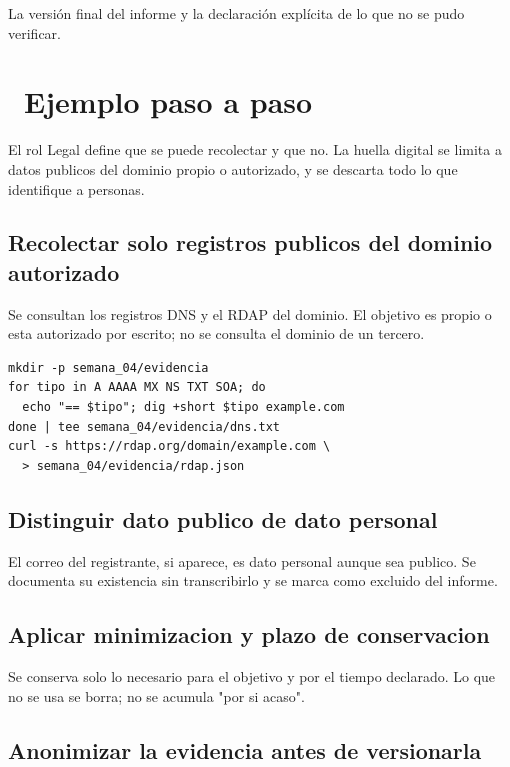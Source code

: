 \documentclass[11pt,a4paper]{article}
\newcommand{\iconotexto}[2]{\textcolor{cyanNeon}{\faIcon{#1}}~#2}
\begin{document}
La versión final del informe y la declaración explícita de lo que no se pudo verificar.

\section{\iconotexto{list-ol}{Ejemplo paso a paso}}

El rol Legal define que se puede recolectar y que no. La huella digital se limita a datos publicos del dominio propio o autorizado, y se descarta todo lo que identifique a personas.

\subsection{Recolectar solo registros publicos del dominio autorizado}

Se consultan los registros DNS y el RDAP del dominio. El objetivo es propio o esta autorizado por escrito; no se consulta el dominio de un tercero.

\begin{lstlisting}[style=estiloCodigo]
mkdir -p semana_04/evidencia
for tipo in A AAAA MX NS TXT SOA; do
  echo "== $tipo"; dig +short $tipo example.com
done | tee semana_04/evidencia/dns.txt
curl -s https://rdap.org/domain/example.com \
  > semana_04/evidencia/rdap.json
\end{lstlisting}

\subsection{Distinguir dato publico de dato personal}

El correo del registrante, si aparece, es dato personal aunque sea publico. Se documenta su existencia sin transcribirlo y se marca como excluido del informe.

\subsection{Aplicar minimizacion y plazo de conservacion}

Se conserva solo lo necesario para el objetivo y por el tiempo declarado. Lo que no se usa se borra; no se acumula "por si acaso".

\subsection{Anonimizar la evidencia antes de versionarla}
\end{document}
